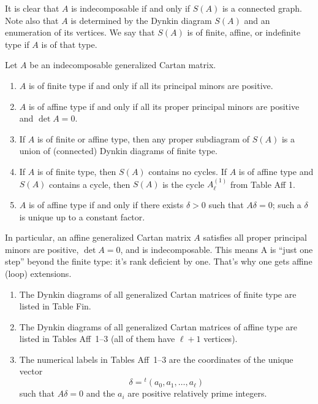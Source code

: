 \documentclass[12pt]{article}
\begin{document}
It is clear that $A$ is indecomposable if and only if $S(A)$ is a connected graph.
Note also that $A$ is determined by the Dynkin diagram $S(A)$ and an enumeration of its vertices.
We say that $S(A)$ is of finite, affine, or indefinite type if $A$ is of that type.

\begin{proposition}\label{prop:finite-affine}
    Let $A$ be an indecomposable generalized Cartan matrix.
    \begin{enumerate}[label=\alph*)]
        \item $A$ is of finite type if and only if all its principal minors are positive.
        \item $A$ is of affine type if and only if all its proper principal minors are positive and $\det A = 0$.
        \item If $A$ is of finite or affine type, then any proper subdiagram of $S(A)$ is a union of (connected) Dynkin diagrams of finite type.
        \item If $A$ is of finite type, then $S(A)$ contains no cycles.
              If $A$ is of affine type and $S(A)$ contains a cycle, then $S(A)$ is the cycle $A_\ell^{(1)}$ from Table Aff 1.
        \item $A$ is of affine type if and only if there exists $\delta>0$ such that $A\delta=0$;
              such a $\delta$ is unique up to a constant factor.
    \end{enumerate}
\end{proposition}
In particular, an affine generalized Cartan matrix $A$ satisfies all proper principal minors are positive, $\det A = 0$, and is indecomposable. This means A is “just one step” beyond the finite type: it's rank deficient by one. That's why one gets affine (loop) extensions.

\begin{theorem}
    \leavevmode
    \begin{enumerate}[label=\alph*)]
        \item The Dynkin diagrams of all generalized Cartan matrices of finite type
              are listed in Table Fin.

        \item The Dynkin diagrams of all generalized Cartan matrices of affine type
              are listed in Tables Aff~1--3 (all of them have $\ell+1$ vertices).

        \item The numerical labels in Tables Aff~1--3 are the coordinates of the unique
              vector \[\delta = {}^t(a_0,a_1,\dots,a_\ell)\] such that $A\delta=0$ and the $a_i$
              are positive relatively prime integers.
    \end{enumerate}
\end{theorem}
\end{document}
